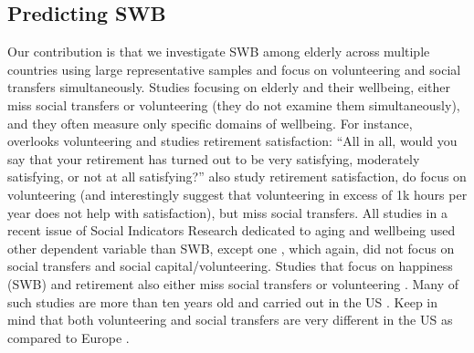 \documentclass[10pt, letterpaper]{article}
\begin{document}
\begin{spacing}{1.4}
\section{Predicting SWB}

Our contribution is that we  investigate SWB among elderly
across multiple countries using large representative samples and focus on volunteering and social transfers simultaneously.  
%
Studies focusing on elderly and their wellbeing, either miss social
transfers or volunteering (they do not examine them simultaneously), and they
often measure only specific domains of wellbeing. For instance,
\citet{bender12} overlooks volunteering and studies retirement satisfaction: ``All in all,
would you say that your retirement has turned out to be very satisfying,
moderately satisfying, or not at all satisfying?''
\citet{butrica2005satisfaction} also study retirement satisfaction, do focus on
volunteering (and interestingly suggest that volunteering in excess of 1k hours
per year does not help with satisfaction), but miss social transfers. All studies in a recent issue of Social Indicators Research \citep{jurges12} dedicated to aging and
wellbeing used other dependent variable than SWB, except one
\citep{angelini2012age}, which again, did not focus on social transfers and social capital/volunteering.
Studies that focus on happiness (SWB) and retirement also either miss social
transfers or volunteering
\citep{dingemans2014involuntary,dingemans2015retirement,nikolova2014employment,angelini2012age}.
 Many of such studies are more than ten years old and carried out in the US
\citep{wheeler98,ferring10}. %
 Keep in mind that both volunteering and social transfers are very different in
 the US as compared to Europe \citep{tocqueville03,fischer10, alesina05al,alesina01,lipset00}.


\end{spacing}
\end{document}
